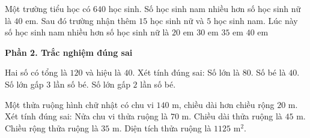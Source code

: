 \begin{ex} %
Một trường tiểu học có $640$ học sinh. Số học sinh nam nhiều hơn số học sinh nữ là $40$ em. Sau đó trường nhận thêm $15$ học sinh nữ và $5$ học sinh nam. Lúc này số học sinh nam nhiều hơn số học sinh nữ là
\choice
{$20$ em}
{\True $30$ em}
{$35$ em}
{$40$ em}
\end{ex}

\textbf{Phần 2. Trắc nghiệm đúng sai}

\begin{ex} %
Hai số có tổng là $120$ và hiệu là $40$. Xét tính đúng sai:
\choiceTF
{\True Số lớn là $80$.}
{\True Số bé là $40$.}
{Số lớn gấp $3$ lần số bé.}
{\True Số lớn gấp $2$ lần số bé.}
\end{ex}

\begin{ex} %
Một thửa ruộng hình chữ nhật có chu vi $140\text{ m}$, chiều dài hơn chiều rộng $20\text{ m}$. Xét tính đúng sai:
\choiceTF
{\True Nửa chu vi thửa ruộng là $70\text{ m}$.}
{\True Chiều dài thửa ruộng là $45\text{ m}$.}
{Chiều rộng thửa ruộng là $35\text{ m}$.}
{\True Diện tích thửa ruộng là $1125\text{ m}^2$.}
\end{ex}

